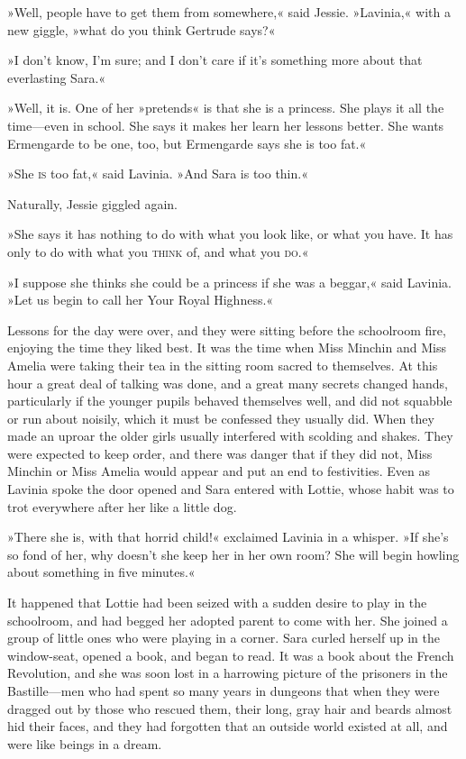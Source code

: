 »Well, people have to get them from somewhere,« said Jessie. »Lavinia,« with a new giggle, »what do you think Gertrude says?«

»I don't know, I'm sure; and I don't care if it's something more about that everlasting Sara.«

»Well, it is. One of her »pretends« is that she is a princess. She plays it all the time—even in school. She says it makes her learn her lessons better. She wants Ermengarde to be one, too, but Ermengarde says she is too fat.«

»She \textsc{is} too fat,« said Lavinia. »And Sara is too thin.«

Naturally, Jessie giggled again.

»She says it has nothing to do with what you look like, or what you have. It has only to do with what you \textsc{think} of, and what you \textsc{do}.«

»I suppose she thinks she could be a princess if she was a beggar,« said Lavinia. »Let us begin to call her Your Royal Highness.«

Lessons for the day were over, and they were sitting before the schoolroom fire, enjoying the time they liked best. It was the time when Miss Minchin and Miss Amelia were taking their tea in the sitting room sacred to themselves. At this hour a great deal of talking was done, and a great many secrets changed hands, particularly if the younger pupils behaved themselves well, and did not squabble or run about noisily, which it must be confessed they usually did. When they made an uproar the older girls usually interfered with scolding and shakes. They were expected to keep order, and there was danger that if they did not, Miss Minchin or Miss Amelia would appear and put an end to festivities. Even as Lavinia spoke the door opened and Sara entered with Lottie, whose habit was to trot everywhere after her like a little dog.

»There she is, with that horrid child!« exclaimed Lavinia in a whisper. »If she's so fond of her, why doesn't she keep her in her own room? She will begin howling about something in five minutes.«

It happened that Lottie had been seized with a sudden desire to play in the schoolroom, and had begged her adopted parent to come with her. She joined a group of little ones who were playing in a corner. Sara curled herself up in the window-seat, opened a book, and began to read. It was a book about the French Revolution, and she was soon lost in a harrowing picture of the prisoners in the Bastille—men who had spent so many years in dungeons that when they were dragged out by those who rescued them, their long, gray hair and beards almost hid their faces, and they had forgotten that an outside world existed at all, and were like beings in a dream.

